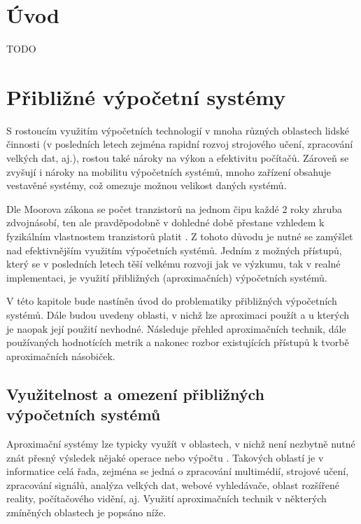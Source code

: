 
%

\chapter{Úvod}
TODO

\chapter{Přibližné výpočetní systémy} 
\label{acs}
S rostoucím využitím výpočetních technologií v mnoha různých oblastech lidské činnosti (v posledních letech zejména rapidní rozvoj strojového učení, zpracování velkých dat, aj.), rostou také nároky na výkon a efektivitu počítačů. Zároveň se zvyšují i nároky na mobilitu výpočetních systémů, mnoho zařízení obsahuje vestavěné systémy, což omezuje možnou velikost daných systémů.

Dle Moorova zákona se počet tranzistorů na jednom čipu každé 2 roky zhruba zdvojnásobí, ten ale pravděpodobně v dohledné době přestane vzhledem k fyzikálním vlastnostem tranzistorů platit \cite{moore}. Z tohoto důvodu je nutné se zamýšlet nad efektivnějším využitím výpočetních systémů.
Jedním z možných přístupů, který se v posledních letech těší velkému rozvoji jak ve výzkumu, tak v realné implementaci, je využití přibližných (aproximačních) výpočetních systémů.

V této kapitole bude nastíněn úvod do problematiky přibližných výpočetních systémů. Dále budou uvedeny oblasti, v nichž lze aproximaci použít a u kterých je naopak její použití nevhodné. Následuje přehled aproximačních technik, dále používaných hodnotících metrik a nakonec rozbor existujících přístupů k tvorbě aproximačních násobiček.

\section{Využitelnost a omezení přibližných výpočetních systémů}
Aproximační systémy lze typicky využít v oblastech, v nichž není nezbytně nutné znát přesný výsledek nějaké operace nebo výpočtu \cite{emerging_paradigm}. Takových oblastí je v informatice celá řada, zejména se jedná o zpracování multimédií, strojové učení, zpracování signálů, analýza velkých dat, webové vyhledávače, oblast rozšířené reality, počítačového vidění, aj. Využití aproximačních technik v některých zmíněných oblastech je popsáno níže.

